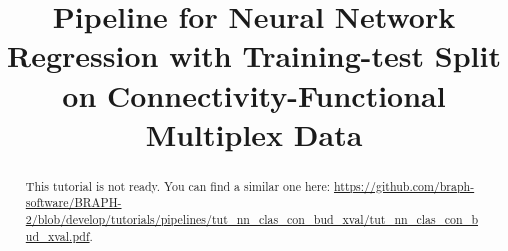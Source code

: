 \documentclass[justified]{tufte-handout}
\title[Regression Training-test Split Connectivity-Functional Multiplex Data]{Pipeline for Neural Network Regression with Training-test Split on Connectivity-Functional Multiplex Data}
\begin{document}
\maketitle

\begin{abstract}
\noindent
This tutorial is not ready. You can find a similar one here: \url{https://github.com/braph-software/BRAPH-2/blob/develop/tutorials/pipelines/tut_nn_clas_con_bud_xval/tut_nn_clas_con_bud_xval.pdf}.
\end{abstract}
\end{document}
